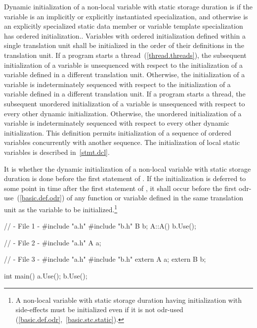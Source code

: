 \pnum
{}%
%
%
Dynamic initialization of a non-local variable with static storage duration is
 if the variable is an implicitly or explicitly instantiated
specialization, and otherwise is 
\enternote an explicitly specialized static data member or
variable template specialization has ordered initialization.\exitnote.
Variables with ordered initialization defined within a single translation unit
shall be initialized in the order of their definitions in the translation unit.
If a program starts a thread~(\ref{thread.threads}), the subsequent
initialization of a variable is unsequenced with respect to the initialization
of a variable defined in a different translation unit.
Otherwise, the initialization of a variable is indeterminately sequenced with
respect to the initialization of a variable defined in a different translation unit.
If a program starts a thread, the subsequent unordered initialization of
a variable is unsequenced with respect to every other dynamic initialization.
Otherwise, the unordered initialization of a variable is
indeterminately sequenced with respect to every other dynamic initialization.
\enternote This definition permits initialization of a sequence of
ordered variables concurrently with another sequence. \exitnote
\enternote The initialization of local static variables is described
in~\ref{stmt.dcl}. \exitnote

\pnum
{}%
It is  whether the
dynamic initialization of a non-local variable with static storage duration is
done before the first statement of . If the initialization is deferred to
some point in time after the first statement of , it shall occur before the
first odr-use~(\ref{basic.def.odr}) of any function or variable
defined in the same translation unit as the variable
to be initialized.\footnote{A non-local variable with static storage duration
having initialization
with side-effects must be initialized even if it is not
odr-used (\ref{basic.def.odr},~\ref{basic.stc.static}).}
\enterexample 

\begin{codeblock}
// - File 1 -
#include "a.h"
#include "b.h"
B b;
A::A(){
  b.Use();
}

// - File 2 -
#include "a.h"
A a;

// - File 3 -
#include "a.h"
#include "b.h"
extern A a;
extern B b;

int main() {
  a.Use();
  b.Use();
}
\end{codeblock}

